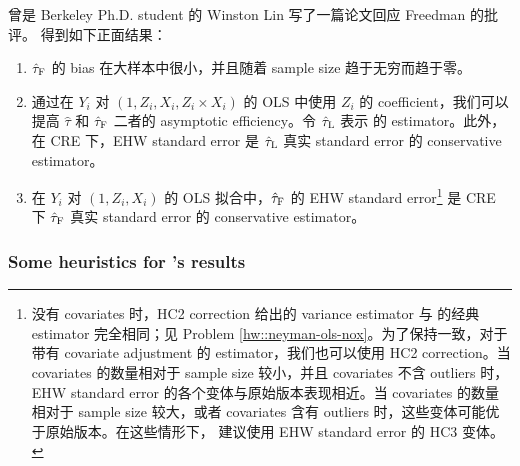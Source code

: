 曾是 Berkeley Ph.D. student 的 Winston Lin 写了一篇论文回应 Freedman 的批评。\citet{lin2013} 得到如下正面结果：
\begin{enumerate}
[(1)]
\item
$\hat{\tau}_\textsc{F}$ 的 bias 在大样本中很小，并且随着 sample size 趋于无穷而趋于零。
\item
通过在 $Y_i$ 对 $(1, Z_i, X_i, Z_i\times X_i)$ 的 OLS 中使用 $Z_i$ 的 coefficient，我们可以提高 $\hat{\tau}$ 和 $\hat{\tau}_\textsc{F}$ 二者的 asymptotic efficiency。令 $\hat{\tau}_\textsc{L}$ 表示 \citet{lin2013} 的 estimator。此外，在 CRE 下，EHW standard error 是 $\hat{\tau}_\textsc{L}$ 真实 standard error 的 conservative estimator。
\item
在 $Y_i$ 对 $(1, Z_i, X_i)$ 的 OLS 拟合中，$\hat{\tau}_\textsc{F}$ 的 EHW standard error\footnote{没有 covariates 时，HC2 correction 给出的 variance estimator 与 \citet{Neyman:1923} 的经典 estimator 完全相同；见 Problem \ref{hw::neyman-ols-nox}。为了保持一致，对于带有 covariate adjustment 的 \citet{lin2013} estimator，我们也可以使用 HC2 correction。当 covariates 的数量相对于 sample size 较小，并且 covariates 不含 outliers 时，EHW standard error 的各个变体与原始版本表现相近。当 covariates 的数量相对于 sample size 较大，或者 covariates 含有 outliers 时，这些变体可能优于原始版本。在这些情形下，\citet{lei2018regression} 建议使用 EHW standard error 的 HC3 变体。}
是 CRE 下 $\hat{\tau}_\textsc{F}$ 真实 standard error 的 conservative estimator。
\end{enumerate}

\subsubsection{Some heuristics for \citet{lin2013}'s results}

